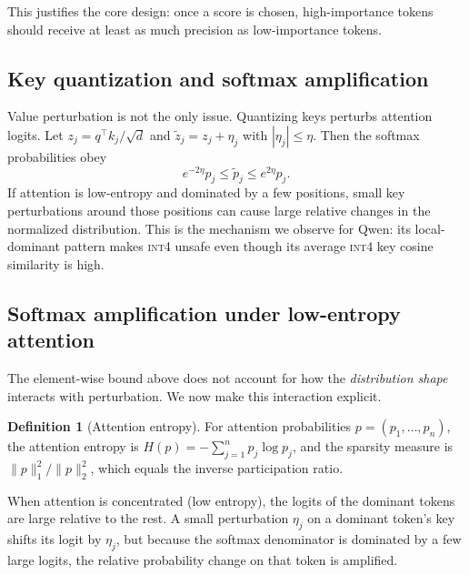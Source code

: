 \documentclass[11pt]{article}
\newcommand{\intiv}{\textsc{int4}}
\theoremstyle{plain}
\theoremstyle{definition}
\newtheorem{definition}{Definition}
\begin{document}
This justifies the core design: once a score is chosen, high-importance tokens should receive at least as much precision as low-importance tokens.

\subsection{Key quantization and softmax amplification}
Value perturbation is not the only issue.  Quantizing keys perturbs attention logits.  Let $z_j=q^\top k_j/\sqrt{d}$ and $\tilde z_j=z_j+\eta_j$ with $|\eta_j|\le \eta$.  Then the softmax probabilities obey
\begin{equation}
  e^{-2\eta}p_j \le \tilde p_j \le e^{2\eta}p_j .
\end{equation}
If attention is low-entropy and dominated by a few positions, small key perturbations around those positions can cause large relative changes in the normalized distribution.  This is the mechanism we observe for Qwen: its local-dominant pattern makes \intiv{} unsafe even though its average \intiv{} key cosine similarity is high.

\subsection{Softmax amplification under low-entropy attention}
\label{sec:softmax-amp}

The element-wise bound above does not account for how the \emph{distribution shape} interacts with perturbation.  We now make this interaction explicit.

\begin{definition}[Attention entropy]
For attention probabilities $p=(p_1,\ldots,p_n)$, the attention entropy is $H(p)=-\sum_{j=1}^n p_j\log p_j$, and the sparsity measure is $\|p\|_1^2/\|p\|_2^2$, which equals the inverse participation ratio.
\end{definition}

When attention is concentrated (low entropy), the logits of the dominant tokens are large relative to the rest.  A small perturbation $\eta_j$ on a dominant token's key shifts its logit by $\eta_j$, but because the softmax denominator is dominated by a few large logits, the relative probability change on that token is amplified.
\end{document}
